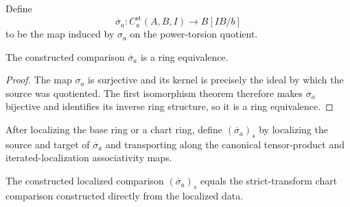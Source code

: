 \begin{definition}
  \label{def:nagata-strict-transform-chart-comparison}

  Define
  \[
    \overline\sigma_a\colon
      C_a^{\mathrm{st}}(A,B,I)\longrightarrow B[IB/b]
  \]
  to be the map induced by $\sigma_a$ on the power-torsion quotient.
\end{definition}

\begin{proposition}
  \label{prop:nagata-strict-transform-chart-iso}

  The constructed comparison $\overline\sigma_a$ is a ring equivalence.
\end{proposition}

\begin{proof}
  The map $\sigma_a$ is surjective and its kernel is precisely the ideal by
  which the source was quotiented.  The first isomorphism theorem therefore
  makes $\overline\sigma_a$ bijective and identifies its inverse ring
  structure, so it is a ring equivalence.
\end{proof}

\begin{definition}
  \label{def:nagata-strict-transform-chart-comparison-localized}

  After localizing the base ring or a chart ring, define
  $(\overline\sigma_a)_s$ by localizing the source and target of
  $\overline\sigma_a$ and transporting along the canonical tensor-product
  and iterated-localization associativity maps.
\end{definition}

\begin{lemma}
  \label{lemma:nagata-strict-transform-chart-localization}

  The constructed localized comparison $(\overline\sigma_a)_s$ equals the
  strict-transform chart comparison constructed directly from the localized
  data.
\end{lemma}

